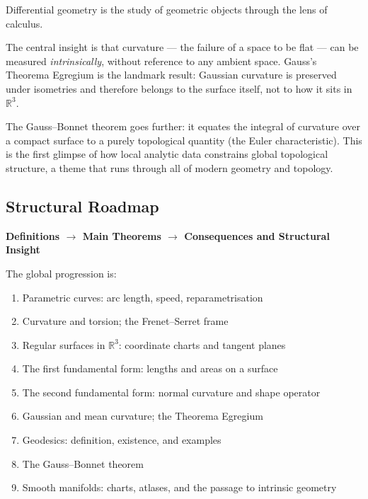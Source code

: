 \begin{tcolorbox}[
  colback=gray!6,
  colframe=gray!40,
  arc=2pt,
  left=8pt, right=8pt, top=6pt, bottom=6pt,
  title={\small\textbf{Structural Role: Differential Geometry — Calculus on Curved Spaces}},
  fonttitle=\small\bfseries
]
Differential geometry is the study of geometric objects through
the lens of calculus.

The central insight is that curvature --- the failure of a space
to be flat --- can be measured \emph{intrinsically}, without
reference to any ambient space.
Gauss's Theorema Egregium is the landmark result: Gaussian
curvature is preserved under isometries and therefore belongs
to the surface itself, not to how it sits in $\mathbb{R}^3$.

The Gauss--Bonnet theorem goes further: it equates the
integral of curvature over a compact surface to a purely
topological quantity (the Euler characteristic).
This is the first glimpse of how local analytic data
constrains global topological structure, a theme that runs
through all of modern geometry and topology.
\end{tcolorbox}
\vspace{1em}

\subsection*{Structural Roadmap}

\begin{center}
\textbf{Definitions $\longrightarrow$ Main Theorems
$\longrightarrow$ Consequences and Structural Insight}
\end{center}

The global progression is:

\begin{enumerate}
  \item Parametric curves: arc length, speed, reparametrisation
  \item Curvature and torsion; the Frenet--Serret frame
  \item Regular surfaces in $\mathbb{R}^3$: coordinate charts
        and tangent planes
  \item The first fundamental form: lengths and areas on a surface
  \item The second fundamental form: normal curvature and shape operator
  \item Gaussian and mean curvature; the Theorema Egregium
  \item Geodesics: definition, existence, and examples
  \item The Gauss--Bonnet theorem
  \item Smooth manifolds: charts, atlases, and the passage to
        intrinsic geometry
\end{enumerate}

